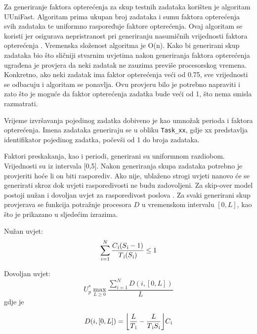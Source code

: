 \documentclass[../zavrsni.tex]{subfiles}
\begin{document}
Za generiranje faktora opterećenja za skup testnih zadataka korišten je algoritam UUniFast. Algoritam prima ukupan broj zadataka 
i sumu faktora opterećenja svih zadataka te uniformno raspoređuje faktore opterećenja. 
Ovaj algoritam se koristi jer osigurava nepristranost pri generiranju nasumičnih vrijednosti faktora opterećenja \cite{clanak_5}.
Vremenska složenost algoritma je O(n). Kako bi generirani skup zadataka bio što sličniji stvarnim uvjetima
nakon generiranja faktora opterećenja ugrađena je provjera da neki zadatak ne zauzima previše procesorskog vremena. Konkretno, ako neki zadatak ima faktor
opterećenja veći od 0.75, sve vrijednosti se odbacuju i algoritam se ponavlja. Ovu provjeru bilo je potrebno napraviti i zato što je moguće da faktor
opterećenja zadatka bude veći od 1, što nema smisla razmatrati.

Vrijeme izvršavanja pojedinog zadatka dobiveno je kao umnožak perioda i faktora opterećenja.
Imena zadataka generiraju se u obliku \texttt{Task\_xx}, gdje xx predstavlja identifikator pojedinog zadatka, počevši od 1 do broja zadataka.

Faktori preskakanja, kao i periodi, generirani su uniformnom razdiobom. Vrijednosti su iz intervala [0,5].
Nakon generiranja skupa zadataka potrebno je provjeriti hoće li on biti rasporediv. Ako nije, ublaženo strogi uvjeti nanovo 
će se generirati skroz dok uvjeti rasporedivosti ne budu zadovoljeni. Za skip-over model postoji nužan i dovoljan uvjet za rasporedivost 
poslova \cite{clanak_4}. Za svaki generirani skup provjerava se funkcija potražnje procesora $D$ u vremenskom intervalu $[0, L]$, kao što je prikazano u sljedećim izrazima. 

Nužan uvjet:
\begin{equation}
    \sum_{i=1}^{N}\frac{C\textsubscript{i}(S\textsubscript{i}-1)}{T\textsubscript{i}(S\textsubscript{i})} \le 1
\end{equation}

Dovoljan uvjet:
\begin{equation}
    U_{p}^{*} \max_{L\geq0}\frac{\sum_{i=1}^{N}D(i,[0,L])}{L}
\end{equation}
gdje je 

\begin{equation}
    D(i,[0,L])=\bigg\lfloor \frac{L}{T\textsubscript{i}}-\frac{L}{T\textsubscript{i}S\textsubscript{i}} \bigg\rfloor C\textsubscript{i}
\end{equation}
\end{document}
